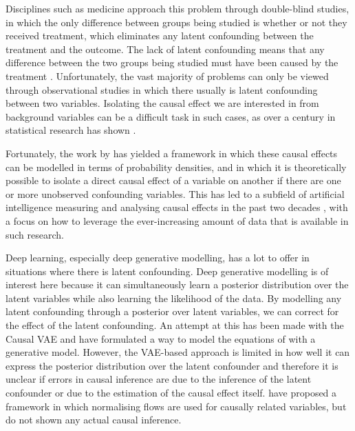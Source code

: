\documentclass{report}
\begin{document}
Disciplines such as medicine approach this problem through double-blind studies, in which the only difference between groups being studied is whether or not they received treatment, which eliminates any latent confounding between the treatment and the outcome. The lack of latent confounding means that any difference between the two groups being studied must have been caused by the treatment \parencite{gotzsche1989methodology}. Unfortunately, the vast majority of problems can only be viewed through observational studies in which there usually is latent confounding between two variables. Isolating the causal effect we are interested in from background variables can be a difficult task in such cases, as over a century in statistical research has shown \parencite{pearson1900x, fisher1936design, huff1993lie, ioannidis2005most}.

Fortunately, the work by \textcite{pearl1995causal, pearl2009causal} has yielded a framework in which these causal effects can be modelled in terms of probability densities, and in which it is theoretically possible to isolate a direct causal effect of a variable on another if there are one or more unobserved confounding variables. This has led to a subfield of artificial intelligence measuring and analysing causal effects in the past two decades \parencite{pearl2003statistics, hill2011bayesian, guo2020survey, mooij2016distinguishing}, with a focus on how to leverage the ever-increasing amount of data that is available in such research.

Deep learning, especially deep generative modelling, has a lot to offer in situations where there is latent confounding. Deep generative modelling is of interest here because it can simultaneously learn a posterior distribution over the latent variables while also learning the likelihood of the data. By modelling any latent confounding through a posterior over latent variables, we can correct for the effect of the latent confounding.  %
An attempt at this has been made with the Causal VAE \parencite{louizos2017causal} and \textcite{parafita2020causal} have formulated a way to model the equations of \textcite{pearl1995causal} with a generative model.  However, the VAE-based approach is limited in how well it can express the posterior distribution over the latent confounder and therefore it is unclear if errors in causal inference are due to the inference of the latent confounder or due to the estimation of the causal effect itself.
\textcite{parafita2020causal} have proposed a framework in which normalising flows are used for causally related variables, but do not shown any actual causal inference.
\end{document}
